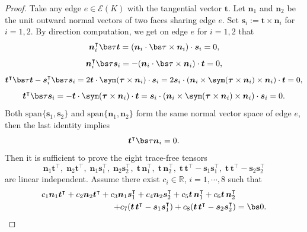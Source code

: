\begin{proof}
Take any edge $e\in\mathcal E(K)$ with the tangential vector $\boldsymbol t$. Let $\boldsymbol n_1$ and $\boldsymbol n_2$ be the unit outward normal vectors of two faces sharing edge $e$. Set $\boldsymbol s_i:=\boldsymbol t\times\boldsymbol n_i$ for $i=1,2$.
By direction computation, we get on edge $e$ for $i=1,2$ that
$$
\boldsymbol n_i^{\intercal}\bs\tau\boldsymbol t=(\boldsymbol n_i\cdot\bs\tau\times\boldsymbol n_i)\cdot\boldsymbol s_i=0,
$$
$$
\boldsymbol n_i^{\intercal}\bs\tau\boldsymbol s_i=-(\boldsymbol n_i\cdot\bs\tau\times\boldsymbol n_i)\cdot\boldsymbol t=0,
$$
$$
\boldsymbol t^{\intercal}\bs\tau\boldsymbol t - \boldsymbol s_i^{\intercal}\bs\tau\boldsymbol s_i=2\boldsymbol t\cdot \sym(\boldsymbol\tau\times\boldsymbol n_i)\cdot\boldsymbol s_i=2\boldsymbol s_i\cdot(\boldsymbol n_i\times \sym(\boldsymbol\tau\times\boldsymbol n_i)\times\boldsymbol n_i)\cdot\boldsymbol t=0,
$$
$$
\boldsymbol t^{\intercal}\bs\tau\boldsymbol s_i=-\boldsymbol t\cdot \sym(\boldsymbol\tau\times\boldsymbol n_i)\cdot\boldsymbol t=\boldsymbol s_i\cdot(\boldsymbol n_i\times \sym(\boldsymbol\tau\times\boldsymbol n_i)\times\boldsymbol n_i)\cdot\boldsymbol s_i=0.
$$
Both $\textrm{span}\{\boldsymbol s_1, \boldsymbol s_2\}$ and $\textrm{span}\{\boldsymbol n_1, \boldsymbol n_2\}$ form the same normal vector space of edge $e$, then the last identity implies
$$
\boldsymbol t^{\intercal}\bs\tau\boldsymbol n_i=0.
$$
Then it is sufficient to prove the eight trace-free tensors 
\begin{equation}\label{eq:nst}
\boldsymbol n_1\boldsymbol t^{\intercal},\; \boldsymbol n_2\boldsymbol t^{\intercal},\; \boldsymbol n_1\boldsymbol s_1^{\intercal},\; \boldsymbol n_2\boldsymbol s_2^{\intercal},\; \boldsymbol t\,\boldsymbol n_1^{\intercal},\; \boldsymbol t\,\boldsymbol n_2^{\intercal},\; \boldsymbol t\,\boldsymbol t^{\intercal}-\boldsymbol s_1\boldsymbol s_1^{\intercal},\; \boldsymbol t\,\boldsymbol t^{\intercal}-\boldsymbol s_2\boldsymbol s_2^{\intercal}
\end{equation}
are linear independent. Assume there exist $c_i\in\mathbb R$, $i=1,\cdots,8$ such that 
\begin{align*}
c_1\boldsymbol n_1\boldsymbol t^{\intercal} + c_2\boldsymbol n_2\boldsymbol t^{\intercal} + c_3\boldsymbol n_1\boldsymbol s_1^{\intercal} + c_4\boldsymbol n_2\boldsymbol s_2^{\intercal} + c_5\boldsymbol t\,\boldsymbol n_1^{\intercal} + c_6\boldsymbol t\,\boldsymbol n_2^{\intercal}&\\+c_7(\boldsymbol t\,\boldsymbol t^{\intercal}-\boldsymbol s_1\boldsymbol s_1^{\intercal}) + c_8(\boldsymbol t\,\boldsymbol t^{\intercal}-\boldsymbol s_2\boldsymbol s_2^{\intercal})&=\bs0.

\end{align*}
\end{proof}
